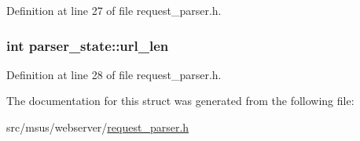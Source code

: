 Definition at line 27 of file request\-\_\-parser.\-h.

\hypertarget{structparser__state_a3ece333d4625d8c6a5f696a738b2fc41}{
\subsubsection[{url\-\_\-len}]{\setlength{\rightskip}{0pt plus 5cm}int parser\-\_\-state\-::url\-\_\-len}}\label{structparser__state_a3ece333d4625d8c6a5f696a738b2fc41}


Definition at line 28 of file request\-\_\-parser.\-h.



The documentation for this struct was generated from the following file\-:\begin{DoxyCompactItemize}
\item 
src/msus/webserver/\hyperlink{request__parser_8h}{request\-\_\-parser.\-h}\end{DoxyCompactItemize}
